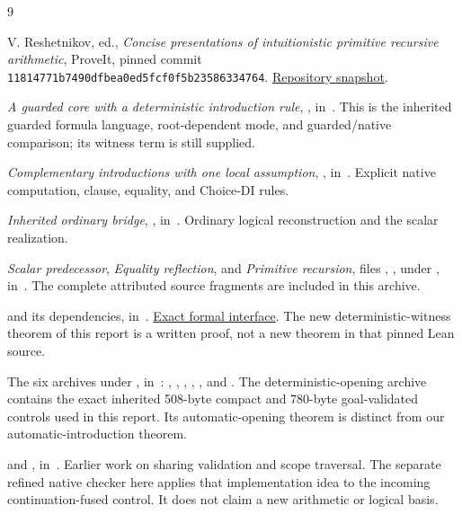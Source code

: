 \clearpage
\begin{thebibliography}{9}\raggedright
{}
V. Reshetnikov, ed., \emph{Concise presentations of intuitionistic primitive
recursive arithmetic}, ProveIt, pinned commit
\texttt{11814771b7490dfbea0ed5fcf0f5b23586334764}.
\href{https://github.com/VladimirReshetnikov/ProveIt/tree/11814771b7490dfbea0ed5fcf0f5b23586334764/Logic/PrimitiveRecursiveArithmetic/ConciseIPRA}{Repository snapshot}.

\emph{A guarded core with a deterministic introduction rule},
, in~\cite{repo}.
This is the inherited guarded formula language, root-dependent mode, and
guarded/native comparison; its witness term is still supplied.

\emph{Complementary introductions with one local assumption},
,
in~\cite{repo}. Explicit native computation, clause, equality, and
Choice-DI rules.

\emph{Inherited ordinary bridge},
,
in~\cite{repo}. Ordinary logical reconstruction and the scalar realization.

\emph{Scalar predecessor}, \emph{Equality reflection}, and
\emph{Primitive recursion}, files
, ,
 under
, in~\cite{repo}.
The complete attributed source fragments are included in this archive.

 and its dependencies,
in~\cite{repo}.
\href{https://github.com/VladimirReshetnikov/ProveIt/blob/11814771b7490dfbea0ed5fcf0f5b23586334764/Logic/PrimitiveRecursiveArithmetic/ConciseIPRA/Lean/ConciseIPRA/NativeBiInterpretation.lean}{Exact formal interface}.
The new deterministic-witness theorem of this report is a written proof,
not a new theorem in that pinned Lean source.

The six archives under , in~\cite{repo}:
,
,
,
,
, and
.
The deterministic-opening archive contains the exact inherited 508-byte
compact and 780-byte goal-validated controls used in this report. Its
automatic-opening theorem is distinct from our automatic-introduction theorem.

 and ,
in~\cite{repo}. Earlier work on sharing validation and scope traversal.
The separate refined native checker here applies that implementation idea
to the incoming continuation-fused control. It does not claim a new
arithmetic or logical basis.
\end{thebibliography}

